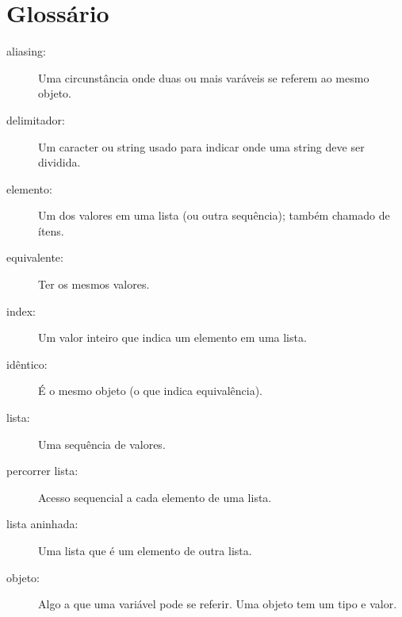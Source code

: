 



\section{Glossário}


\begin{description}

\item[aliasing:] Uma circunstância onde duas ou mais varáveis se referem ao mesmo objeto.

\item[delimitador:] Um caracter ou string usado para indicar onde uma string deve ser dividida.

\item[elemento:] Um dos valores em uma lista (ou outra sequência);
também chamado de ítens.

\item[equivalente:] Ter os mesmos valores.

\item[index:] Um valor inteiro que indica um elemento em uma lista.

\item[idêntico:] É o mesmo objeto (o que indica equivalência).

\item[lista:] Uma sequência de valores.

\item[percorrer lista:] Acesso sequencial a cada elemento de uma lista.

\item[lista aninhada:] Uma lista que é um elemento de outra lista.

\item[objeto:] Algo a que uma variável pode se referir. Uma objeto tem um tipo e valor.


\end{description}
